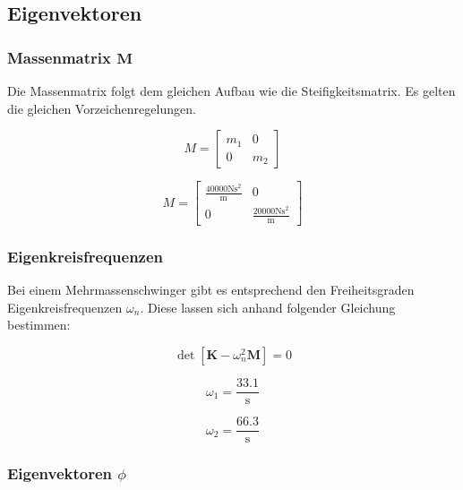 \documentclass[
  letterpaper,
  DIV=11]{scrreprt}
\begin{document}
\hypertarget{eigenvektoren}{%
\subsection{Eigenvektoren}\label{eigenvektoren}}

\hypertarget{massenmatrix-mathbfm}{%
\subsubsection{\texorpdfstring{Massenmatrix
\(\mathbf{M}\)}{Massenmatrix \textbackslash mathbf\{M\}}}\label{massenmatrix-mathbfm}}

Die Massenmatrix folgt dem gleichen Aufbau wie die Steifigkeitsmatrix.
Es gelten die gleichen Vorzeichenregelungen.

\begin{equation}M = \left[\begin{matrix}m_{1} & 0\\0 & m_{2}\end{matrix}\right]\end{equation}

\begin{equation}M = \left[\begin{matrix}\frac{40000 \text{N} \text{s}^{2}}{\text{m}} & 0\\0 & \frac{20000 \text{N} \text{s}^{2}}{\text{m}}\end{matrix}\right]\end{equation}

\hypertarget{eigenkreisfrequenzen-1}{%
\subsubsection{Eigenkreisfrequenzen}\label{eigenkreisfrequenzen-1}}

Bei einem Mehrmassenschwinger gibt es entsprechend den Freiheitsgraden
Eigenkreisfrequenzen \(\omega_n\). Diese lassen sich anhand folgender
Gleichung bestimmen:

\[\det{[\mathbf{K}-\omega_n^2 \mathbf{M}]=0}\]

\begin{equation}\omega_{1} = \frac{33.1}{\text{s}}\end{equation}

\begin{equation}\omega_{2} = \frac{66.3}{\text{s}}\end{equation}

\hypertarget{eigenvektoren-phi}{%
\subsubsection{\texorpdfstring{Eigenvektoren
\(\phi\)}{Eigenvektoren \textbackslash phi}}\label{eigenvektoren-phi}}
\end{document}
